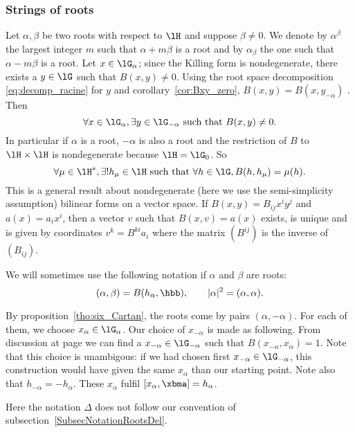 \subsubsection{Strings of roots}


Let $\alpha,\beta$ be two roots with respect to $\lH$ and suppose $\beta\neq 0$. We denote by $\alpha^{\beta}$ the largest integer $m$ such that $\alpha+m\beta$ is a root and by $\alpha_{\beta}$ the one such that $\alpha-m\beta$ is a root. Let $x\in\lG_{\alpha}$; since the Killing form is nondegenerate, there exists a $y\in\lG$ such that $B(x,y)\neq 0$. Using the root space decomposition \eqref{eq:decomp_racine} for $y$ and corollary~\ref{cor:Bxy_zero}, $B(x,y)=B(x,y_{-\alpha})$ . Then \label{pg:root_ss}
\[
	\forall x\in\lG_{\alpha},\exists y\in\lG_{-\alpha}\textrm{ such that } B(x,y)\neq 0.
\]
In particular if $\alpha$ is a root, $-\alpha$ is also a root and the restriction of $B$ to $\lH\times\lH$ is nondegenerate because $\lH=\lG_0$. So
\[
	\forall\mu\in\lH^*,\exists!h_{\mu}\in\lH\textrm{ such that } \forall h\in\lG, B(h,h_{\mu})=\mu(h).
\]
This is a general result about nondegenerate (here we use the semi-simplicity assumption) bilinear forms on a vector space. If $B(x,y)=B_{ij}x^iy^j$ and $a(x)=a_ix^i$, then a vector $v$ such that $B(x,v)=a(x)$ exists, is unique and is given by coordinates $v^k=B^{ki}a_i$ where the matrix $(B^{ij})$ is the inverse of $(B_{ij})$.

We will sometimes use the following notation if $\alpha$ and $\beta$ are roots:
\[
	(\alpha,\beta)=B( h_{\alpha},\hbb),\qquad |\alpha|^2=(\alpha,\alpha).
\]

By proposition~\ref{tho:six_Cartan}, the roots come by pairs $(\alpha,-\alpha)$. For each of them, we choose $x_{\alpha}\in\lG_{\alpha}$. Our choice of $x_{-\alpha}$ is made as following. From discussion at page \pageref{pg:root_ss} we can find a $x_{-\alpha}\in\lG_{-\alpha}$ such that $B(x_{-\alpha},x_{\alpha})=1$. Note that this choice is unambigous: if we had chosen first $x_{-\alpha}\in\lG_{-\alpha}$, this construction would have given the same $x_{\alpha}$ than our starting point. Note also that $h_{-\alpha}=-h_{\alpha}$. These $ x_{\alpha}$ fulfil $[ x_{\alpha},\xbma]= h_{\alpha}$.

\begin{probleme}
	Here the notation \( \Delta\) does not follow our convention of subsection~\ref{SubsecNotationRootsDel}.
\end{probleme}

